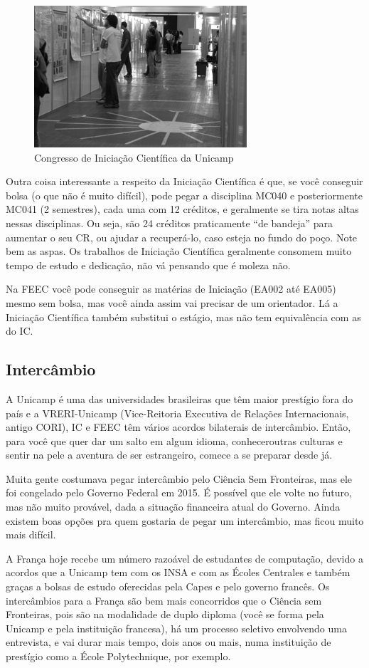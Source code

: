 \begin{figure}[h!]
    \centering
    \includegraphics[width=.45\textwidth]{img/unicamp/congresso.jpg}
    \caption*{Congresso de Iniciação Científica da Unicamp}
\end{figure}

Outra coisa interessante a respeito da Iniciação Científica é que, se você
conseguir bolsa (o que não é muito difícil), pode pegar a disciplina MC040 e
posteriormente MC041 (2 semestres), cada uma com 12 créditos, e geralmente se
tira notas altas nessas disciplinas. Ou seja, são 24 créditos praticamente ``de
bandeja'' para aumentar o seu CR, ou ajudar a recuperá-lo, caso esteja no fundo
do poço. Note bem as aspas. Os trabalhos de Iniciação Científica geralmente
consomem muito tempo de estudo e dedicação, não vá pensando que é moleza não.

Na FEEC você pode conseguir as matérias de Iniciação (EA002 até EA005) mesmo sem
bolsa, mas você ainda assim vai precisar de um orientador. Lá a Iniciação
Científica também substitui o estágio, mas não tem equivalência com as do IC.

\subsection{Intercâmbio}

A Unicamp é uma das universidades brasileiras que têm maior prestígio fora do
país e a VRERI-Unicamp (Vice-Reitoria Executiva de Relações Internacionais,
antigo CORI), IC e FEEC têm vários acordos bilaterais de intercâmbio. Então,
para você que quer dar um salto em algum idioma, conheceroutras culturas e
sentir na pele a aventura de ser estrangeiro, comece a se preparar desde já.

Muita gente costumava pegar intercâmbio pelo Ciência Sem Fronteiras, mas ele
foi congelado pelo Governo Federal em 2015. É possível que ele volte no futuro,
mas não muito provável, dada a situação financeira atual do Governo. Ainda existem
boas opções pra quem gostaria de pegar um intercâmbio, mas ficou muito mais 
difícil.

A França hoje recebe um número razoável de estudantes de computação, devido a
acordos que a Unicamp tem com os INSA e com as Écoles Centrales e também graças a
bolsas de estudo oferecidas pela Capes e pelo governo francês. Os intercâmbios
para a França são bem mais concorridos que o Ciência sem Fronteiras, pois são na
modalidade de duplo diploma (você se forma pela Unicamp e pela instituição
francesa), há um processo seletivo envolvendo uma entrevista, e vai durar mais tempo,
dois anos ou mais, numa instituição de prestígio como a École Polytechnique, por
exemplo.

